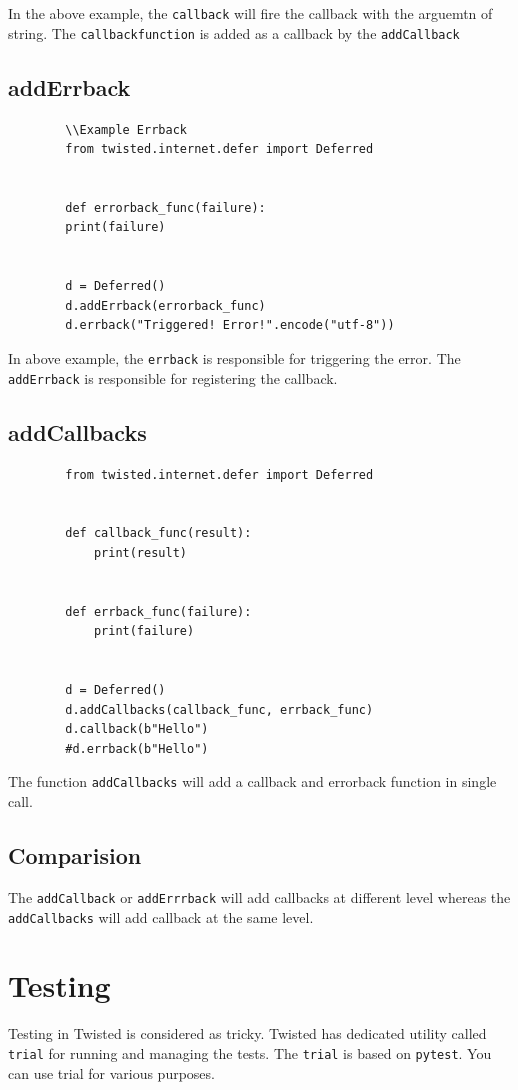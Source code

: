 \documentclass{article}
\begin{document}
      In the above example, the \texttt{callback} will fire the callback with the
      arguemtn of string. The \texttt{callbackfunction} is added as a callback
      by the \texttt{addCallback}

    \subsection{addErrback}
      \begin{verbatim}
        \\Example Errback
        from twisted.internet.defer import Deferred


        def errorback_func(failure):
        print(failure)


        d = Deferred()
        d.addErrback(errorback_func)
        d.errback("Triggered! Error!".encode("utf-8"))
      \end{verbatim}

      In above example, the \texttt{errback} is responsible for triggering the
      error. The \texttt{addErrback} is responsible for registering the callback.

    \subsection{addCallbacks}
      \begin{verbatim}
        from twisted.internet.defer import Deferred


        def callback_func(result):
            print(result)


        def errback_func(failure):
            print(failure)


        d = Deferred()
        d.addCallbacks(callback_func, errback_func)
        d.callback(b"Hello")
        #d.errback(b"Hello")
      \end{verbatim}

      The function \texttt{addCallbacks} will add a callback and errorback
      function in single call.

    \subsection{Comparision}

      The \texttt{addCallback} or \texttt{addErrrback} will add callbacks at
      different level whereas the \texttt{addCallbacks} will add callback at
      the same level.

  \section{Testing}
    Testing in Twisted is considered as tricky. Twisted has dedicated utility
    called \texttt{trial} for running and managing the tests. The
    \texttt{trial} is based on \texttt{pytest}. You can use trial for various
    purposes.
\end{document}
